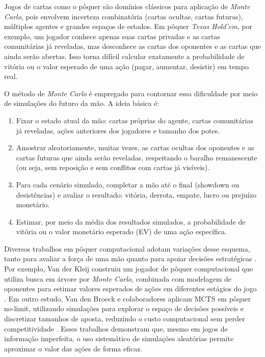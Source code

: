 Jogos de cartas como o pôquer são domínios clássicos para aplicação de \textit{Monte Carlo}, pois envolvem incerteza combinatória (cartas ocultas, cartas futuras), múltiplos agentes e grandes espaços de estados. Em pôquer \textit{Texas Hold'em}, por exemplo, um jogador conhece apenas suas cartas privadas e as cartas comunitárias já reveladas, mas desconhece as cartas dos oponentes e as cartas que ainda serão abertas. Isso torna difícil calcular exatamente a probabilidade de vitória ou o valor esperado de uma ação (pagar, aumentar, desistir) em tempo real.

O método de \textit{Monte Carlo} é empregado para contornar essa dificuldade por meio de simulações do futuro da mão. A ideia básica é:
\begin{enumerate}
      \item Fixar o estado atual da mão: cartas próprias do agente, cartas comunitárias já reveladas, ações anteriores dos jogadores e tamanho dos potes.
      \item Amostrar aleatoriamente, muitas vezes, as cartas ocultas dos oponentes e as cartas futuras que ainda serão reveladas, respeitando o baralho remanescente (ou seja, sem reposição e sem conflitos com cartas já visíveis).
      \item Para cada cenário simulado, completar a mão até o final (showdown ou desistências) e avaliar o resultado: vitória, derrota, empate, lucro ou prejuízo monetário.
      \item Estimar, por meio da média dos resultados simulados, a probabilidade de vitória ou o valor monetário esperado (EV) de uma ação específica.
\end{enumerate}

Diversos trabalhos em pôquer computacional adotam variações desse esquema, tanto para avaliar a força de uma mão quanto para apoiar decisões estratégicas . Por exemplo, Van der Kleij construiu um jogador de pôquer computacional que utiliza busca em árvore por \textit{Monte Carlo}, combinada com modelagem de oponentes para estimar valores esperados de ações em diferentes estágios do jogo . Em outro estudo, Van den Broeck e colaboradores aplicam \gls{MCTS} em pôquer no-limit, utilizando simulações para explorar o espaço de decisões possíveis e discretizar tamanhos de aposta, reduzindo o custo computacional sem perder competitividade . Esses trabalhos demonstram que, mesmo em jogos de informação imperfeita, o uso sistemático de simulações aleatórias permite aproximar o valor das ações de forma eficaz.

